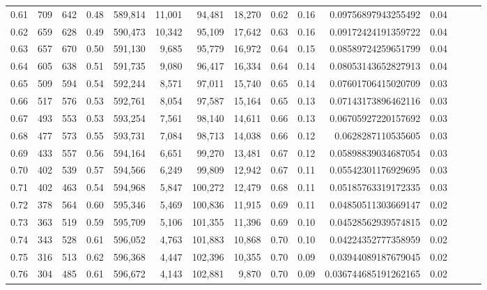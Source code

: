 \begin{tabular}{rrrrrrrrrrrrrrr}
0.61 &     709 &    642 &  0.48 &  589,814 &   11,001 &   94,481 &   18,270 &  0.62 &  0.16 &    0.09756897943255492 &      0.04 \\
0.62 &     659 &    628 &  0.49 &  590,473 &   10,342 &   95,109 &   17,642 &  0.63 &  0.16 &    0.09172424191359722 &      0.04 \\
0.63 &     657 &    670 &  0.50 &  591,130 &    9,685 &   95,779 &   16,972 &  0.64 &  0.15 &    0.08589724259651799 &      0.04 \\
0.64 &     605 &    638 &  0.51 &  591,735 &    9,080 &   96,417 &   16,334 &  0.64 &  0.14 &    0.08053143652827913 &      0.04 \\
0.65 &     509 &    594 &  0.54 &  592,244 &    8,571 &   97,011 &   15,740 &  0.65 &  0.14 &    0.07601706415020709 &      0.03 \\
0.66 &     517 &    576 &  0.53 &  592,761 &    8,054 &   97,587 &   15,164 &  0.65 &  0.13 &    0.07143173896462116 &      0.03 \\
0.67 &     493 &    553 &  0.53 &  593,254 &    7,561 &   98,140 &   14,611 &  0.66 &  0.13 &    0.06705927220157692 &      0.03 \\
0.68 &     477 &    573 &  0.55 &  593,731 &    7,084 &   98,713 &   14,038 &  0.66 &  0.12 &     0.0628287110535605 &      0.03 \\
0.69 &     433 &    557 &  0.56 &  594,164 &    6,651 &   99,270 &   13,481 &  0.67 &  0.12 &    0.05898839034687054 &      0.03 \\
0.70 &     402 &    539 &  0.57 &  594,566 &    6,249 &   99,809 &   12,942 &  0.67 &  0.11 &    0.05542301176929695 &      0.03 \\
0.71 &     402 &    463 &  0.54 &  594,968 &    5,847 &  100,272 &   12,479 &  0.68 &  0.11 &    0.05185763319172335 &      0.03 \\
0.72 &     378 &    564 &  0.60 &  595,346 &    5,469 &  100,836 &   11,915 &  0.69 &  0.11 &    0.04850511303669147 &      0.02 \\
0.73 &     363 &    519 &  0.59 &  595,709 &    5,106 &  101,355 &   11,396 &  0.69 &  0.10 &    0.04528562939574815 &      0.02 \\
0.74 &     343 &    528 &  0.61 &  596,052 &    4,763 &  101,883 &   10,868 &  0.70 &  0.10 &    0.04224352777358959 &      0.02 \\
0.75 &     316 &    513 &  0.62 &  596,368 &    4,447 &  102,396 &   10,355 &  0.70 &  0.09 &    0.03944089187679045 &      0.02 \\
0.76 &     304 &    485 &  0.61 &  596,672 &    4,143 &  102,881 &    9,870 &  0.70 &  0.09 &   0.036744685191262165 &      0.02 \\

\end{tabular}
